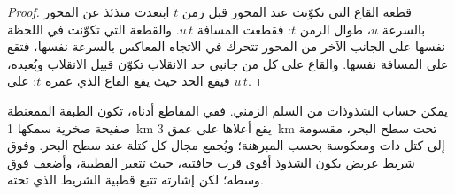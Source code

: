 \begin{proof}
قطعة القاع التي تكوّنت عند المحور قبل زمن $t$ ابتعدت منذئذ عن
المحور بالسرعة $u$، طوال الزمن $t$: فقطعت المسافة
$u\,t$. والقطعة التي تكوّنت في اللحظة نفسها على الجانب الآخر من المحور تتحرك
في الاتجاه المعاكس بالسرعة نفسها، فتقع على المسافة نفسها. والقاع على
كل من جانبي حد الانقلاب تكوّن قبيل الانقلاب وبُعيده،
فيقع الحد حيث يقع القاع الذي عمره $t$: على $u\,t$.
\end{proof}

يمكن حساب الشذوذات من السلم الزمني. ففي المقاطع أدناه، تكون
الطبقة الممغنطة صفيحة صخرية سمكها \qty{1}{km} يقع أعلاها
على عمق \qty{3}{km} تحت سطح البحر، مقسومة إلى كتل ذات  ومعكوسة
بحسب المبرهنة؛ ويُجمع مجال كل كتلة عند سطح البحر. وفوق شريط عريض يكون الشذوذ
أقوى قرب حافتيه، حيث تتغير القطبية، وأضعف فوق
وسطه؛ لكن إشارته تتبع قطبية الشريط
الذي تحته.

